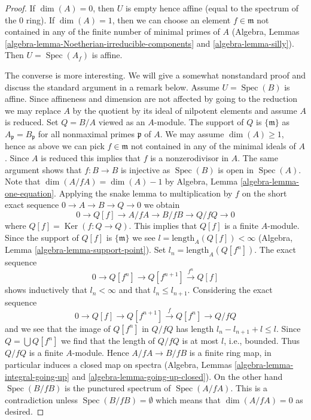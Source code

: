 \documentclass[10pt,a4paper]{amsart}
\theoremstyle{plain}
\theoremstyle{definition}
\theoremstyle{remark}
\numberwithin{equation}{subsection}
\def\Spec{\mathop{\mathrm{Spec}}}
\def\Ker{\mathop{\mathrm{Ker}}}
\begin{document}
\begin{proof}
If $\dim(A) = 0$, then $U$ is empty hence affine (equal to the spectrum of
the $0$ ring). If $\dim(A) = 1$, then we can choose an element
$f \in \mathfrak m$ not contained in any of the finite number of minimal
primes of $A$
(Algebra, Lemmas \ref{algebra-lemma-Noetherian-irreducible-components} and
\ref{algebra-lemma-silly}). Then $U = \Spec(A_f)$
is affine.

\medskip\noindent
The converse is more interesting. We will give a somewhat nonstandard proof
and discuss the standard argument in a remark below.
Assume $U = \Spec(B)$ is affine. Since affineness and dimension are not
affected by going to the reduction we may replace $A$ by the quotient by
its ideal of nilpotent elements and assume $A$ is reduced.
Set $Q = B/A$ viewed as an $A$-module.
The support of $Q$ is $\{\mathfrak m\}$ as $A_\mathfrak p = B_\mathfrak p$
for all nonmaximal primes $\mathfrak p$ of $A$.
We may assume $\dim(A) \geq 1$, hence as above we can pick
$f \in \mathfrak m$ not contained in any of the minimal ideals of $A$.
Since $A$ is reduced this implies that $f$ is a nonzerodivisor in $A$.
The same argument shows that $f : B \to B$ is injective as $\Spec(B)$
is open in $\Spec(A)$. Note that $\dim(A/fA) = \dim(A) - 1$ by
Algebra, Lemma \ref{algebra-lemma-one-equation}.
Applying the snake lemma to multiplication by $f$ on the short
exact sequence $0 \to A \to B \to Q \to 0$ we obtain
$$
0 \to Q[f] \to A/fA \to B/fB \to Q/fQ \to 0
$$
where $Q[f] = \Ker(f : Q \to Q)$.
This implies that $Q[f]$ is a finite $A$-module. Since the support of
$Q[f]$ is $\{\mathfrak m\}$ we see $l = \text{length}_A(Q[f]) < \infty$
(Algebra, Lemma \ref{algebra-lemma-support-point}).
Set $l_n = \text{length}_A(Q[f^n])$. The exact sequence
$$
0 \to Q[f^n] \to Q[f^{n + 1}] \xrightarrow{f^n} Q[f]
$$
shows inductively that $l_n < \infty$ and that $l_n \leq l_{n + 1}$.
Considering the exact sequence
$$
0 \to Q[f] \to Q[f^{n + 1}] \xrightarrow{f} Q[f^n] \to Q/fQ
$$
and we see that the image of $Q[f^n]$ in $Q/fQ$ has length
$l_n - l_{n + 1} + l \leq l$. Since $Q = \bigcup Q[f^n]$ we
find that the length of $Q/fQ$ is at most $l$, i.e., bounded.
Thus $Q/fQ$ is a finite $A$-module. Hence $A/fA \to B/fB$ is a
finite ring map, in particular induces a closed map on spectra
(Algebra, Lemmas \ref{algebra-lemma-integral-going-up} and
\ref{algebra-lemma-going-up-closed}).
On the other hand $\Spec(B/fB)$ is the punctured spectrum of $\Spec(A/fA)$.
This is a contradiction unless $\Spec(B/fB) = \emptyset$ which
means that $\dim(A/fA) = 0$ as desired.
\end{proof}
\end{document}

